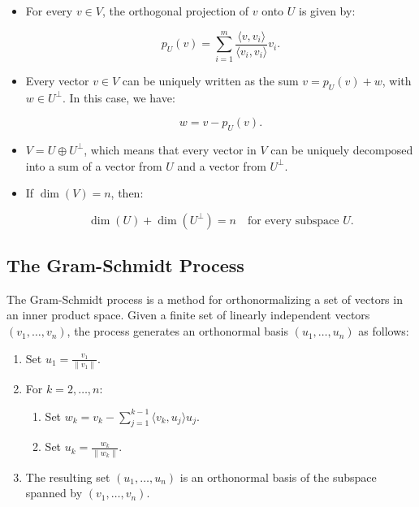 \begin{itemize}
    \item For every \( v \in V \), the orthogonal projection of \( v \) onto \( U \) is given by:
        
          \[
               p_U(v) = \sum_{i=1}^{m} \frac{\langle v, v_i \rangle}{\langle v_i, v_i \rangle} v_i.
          \]

    \item Every vector \( v \in V \) can be uniquely written as the sum \( v = p_U(v) + w \), with 
          \( w \in U^\perp \). In this case, we have:
          
          \[
               w = v - p_U(v).
          \]

    \item \( V = U \oplus U^\perp \), which means that every vector in \( V \) can be uniquely 
          decomposed into a sum of a vector from \( U \) and a vector from \( U^\perp \).

    \item If \( \dim(V) = n \), then:
  
          \[
               \dim(U) + \dim(U^\perp) = n \quad \text{for every subspace } U.
          \]

\end{itemize}

\subsection{The Gram-Schmidt Process}

The Gram-Schmidt process is a method for orthonormalizing a set of vectors in an inner product space. 
Given a finite set of linearly independent vectors \( (v_1, \ldots, v_n) \), the process generates an orthonormal basis \( (u_1, \ldots, u_n) \) as follows:

\begin{enumerate}

    \item Set \( u_1 = \frac{v_1}{\|v_1\|} \).
    
    \item For \( k = 2, \ldots, n \):

    \begin{enumerate}
        
        \item Set \( w_k = v_k - \sum_{j=1}^{k-1} \langle v_k, u_j \rangle u_j \).
        
        \item Set \( u_k = \frac{w_k}{\|w_k\|} \).
    
    \end{enumerate}

    \item The resulting set \( (u_1, \ldots, u_n) \) is an orthonormal basis of the subspace spanned 
          by \( (v_1, \ldots, v_n) \).

        \end{enumerate}

